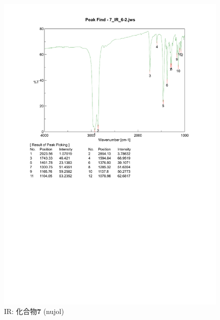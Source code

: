 \documentclass{ltjsarticle}
\theoremstyle{definition}
\numberwithin{equation}{section}
\begin{document}
\begin{figure}[htbp]
\begin{center}
\includegraphics[width = 15 cm]{IR_6-2-2.pdf}
\caption{IR: 化合物\textbf{7} (nujol)}
\label{IR_6-2-2}
\end{center}
\end{figure}

\newpage
\end{document}
